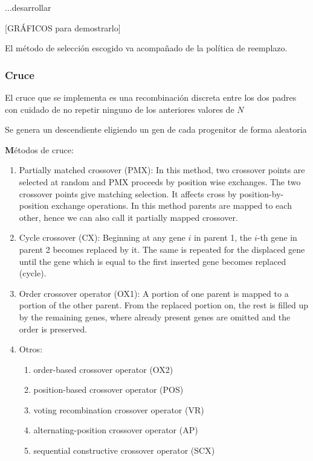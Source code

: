 \documentclass[12pt]{article}
\begin{document}
...desarrollar

[GRÁFICOS para demostrarlo]

El método de selección escogido va acompañado de la política de reemplazo.

\subsubsection{Cruce}

El cruce que se implementa es una recombinación discreta entre los dos padres con cuidado de no repetir ninguno de los anteriores valores de $N$ 

Se genera un descendiente eligiendo un gen de cada progenitor de forma aleatoria

\textbf Métodos de cruce:

\begin{enumerate}
    \item Partially matched crossover (PMX): In this method, two crossover points are selected at random and PMX proceeds by position wise exchanges. The two crossover points give matching selection. It affects cross by position-by-position exchange operations. In this method parents are mapped to each other, hence we can also call it partially mapped crossover.
    \item Cycle crossover (CX): Beginning at any gene $i$ in parent 1, the $i$-th gene in parent 2 becomes replaced by it. The same is repeated for the displaced gene until the gene which is equal to the first inserted gene becomes replaced (cycle).
    \item Order crossover operator (OX1): A portion of one parent is mapped to a portion of the other parent. From the replaced portion on, the rest is filled up by the remaining genes, where already present genes are omitted and the order is preserved.
    \item Otros: 
    \begin{enumerate}
        \item order-based crossover operator (OX2)
        \item position-based crossover operator (POS)
        \item voting recombination crossover operator (VR)
        \item alternating-position crossover operator (AP)
        \item sequential constructive crossover operator (SCX)
    \end{enumerate}
\end{enumerate}
\end{document}
